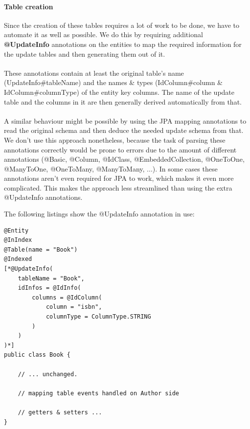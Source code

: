 \pagebreak

\paragraph{Table creation} \label{creating_the_tables}

Since the creation of these tables requires a lot of work to be done, we have to automate it as well as possible. We do this by requiring additional \textbf{@UpdateInfo} annotations on the entities to map the required information for the update tables and then generating them out of it.
\\\\
These annotations contain at least the original table's name (UpdateInfo\#tableName) and the names \& types (IdColumn\#column \& IdColumn\#columnType) of the entity key columns. The name of the update table and the columns in it are then generally derived automatically from that. 
\\\\
A similar behaviour might be possible by using the JPA mapping annotations to read the original schema and then deduce the needed update schema from that. We don't use this approach nonetheless, because the task of parsing these annotations correctly would be prone to errors due to the amount of different annotations (@Basic, @Column, @IdClass, @EmbeddedCollection, @OneToOne, @ManyToOne, @OneToMany, @ManyToMany, ...). In some cases these annotations aren't even required for JPA to work, which makes it even more complicated. This makes the approach less streamlined than using the extra @UpdateInfo annotations.

\pagebreak
\noindent
The following listings show the @UpdateInfo annotation in use:
\\
\lstset{language=java}
\begin{lstlisting}[frame=htrbl, caption={Book.java with Hibernate Search annotations}, label={lst:book.java_3}]
@Entity
@InIndex
@Table(name = "Book")
@Indexed
[*@UpdateInfo(
	tableName = "Book", 
	idInfos = @IdInfo(
		columns = @IdColumn(
			column = "isbn", 
			columnType = ColumnType.STRING
		)
	)
)*]
public class Book {

	// ... unchanged. 
	
	// mapping table events handled on Author side
	
	// getters & setters ...
}
\end{lstlisting}

\pagebreak

